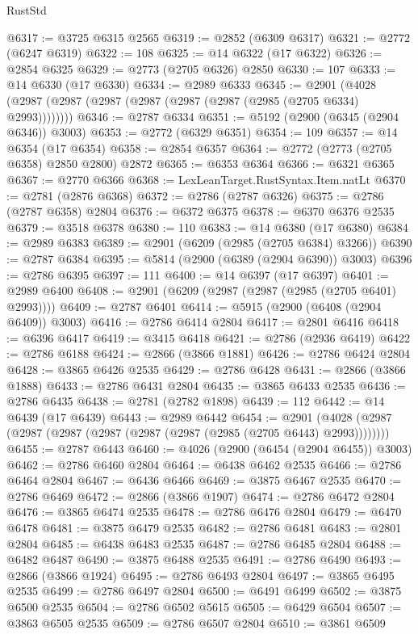 \begin{lexlean}{RustStd}
\begin{coremodule}
@6317 := @3725 @6315 @2565
@6319 := @2852 (@6309 @6317)
@6321 := @2772 (@6247 @6319)
@6322 := 108
@6325 := @14 @6322 (@17 @6322)
@6326 := @2854 @6325
@6329 := @2773 (@2705 @6326) @2850
@6330 := 107
@6333 := @14 @6330 (@17 @6330)
@6334 := @2989 @6333
@6345 := @2901 (@4028 (@2987 (@2987 (@2987 (@2987 (@2987 (@2987 (@2985 (@2705 @6334) @2993))))))))
@6346 := @2787 @6334
@6351 := @5192 (@2900 (@6345 (@2904 @6346)) @3003)
@6353 := @2772 (@6329 @6351)
@6354 := 109
@6357 := @14 @6354 (@17 @6354)
@6358 := @2854 @6357
@6364 := @2772 (@2773 (@2705 @6358) @2850 @2800) @2872
@6365 := @6353 @6364
@6366 := @6321 @6365
@6367 := @2770 @6366
@6368 := LexLeanTarget.RustSyntax.Item.natLt
@6370 := @2781 (@2876 @6368)
@6372 := @2786 (@2787 @6326)
@6375 := @2786 (@2787 @6358) @2804
@6376 := @6372 @6375
@6378 := @6370 @6376 @2535
@6379 := @3518 @6378
@6380 := 110
@6383 := @14 @6380 (@17 @6380)
@6384 := @2989 @6383
@6389 := @2901 (@6209 (@2985 (@2705 @6384) @3266))
@6390 := @2787 @6384
@6395 := @5814 (@2900 (@6389 (@2904 @6390)) @3003)
@6396 := @2786 @6395
@6397 := 111
@6400 := @14 @6397 (@17 @6397)
@6401 := @2989 @6400
@6408 := @2901 (@6209 (@2987 (@2987 (@2985 (@2705 @6401) @2993))))
@6409 := @2787 @6401
@6414 := @5915 (@2900 (@6408 (@2904 @6409)) @3003)
@6416 := @2786 @6414 @2804
@6417 := @2801 @6416
@6418 := @6396 @6417
@6419 := @3415 @6418
@6421 := @2786 (@2936 @6419)
@6422 := @2786 @6188
@6424 := @2866 (@3866 @1881)
@6426 := @2786 @6424 @2804
@6428 := @3865 @6426 @2535
@6429 := @2786 @6428
@6431 := @2866 (@3866 @1888)
@6433 := @2786 @6431 @2804
@6435 := @3865 @6433 @2535
@6436 := @2786 @6435
@6438 := @2781 (@2782 @1898)
@6439 := 112
@6442 := @14 @6439 (@17 @6439)
@6443 := @2989 @6442
@6454 := @2901 (@4028 (@2987 (@2987 (@2987 (@2987 (@2987 (@2987 (@2985 (@2705 @6443) @2993))))))))
@6455 := @2787 @6443
@6460 := @4026 (@2900 (@6454 (@2904 @6455)) @3003)
@6462 := @2786 @6460 @2804
@6464 := @6438 @6462 @2535
@6466 := @2786 @6464 @2804
@6467 := @6436 @6466
@6469 := @3875 @6467 @2535
@6470 := @2786 @6469
@6472 := @2866 (@3866 @1907)
@6474 := @2786 @6472 @2804
@6476 := @3865 @6474 @2535
@6478 := @2786 @6476 @2804
@6479 := @6470 @6478
@6481 := @3875 @6479 @2535
@6482 := @2786 @6481
@6483 := @2801 @2804
@6485 := @6438 @6483 @2535
@6487 := @2786 @6485 @2804
@6488 := @6482 @6487
@6490 := @3875 @6488 @2535
@6491 := @2786 @6490
@6493 := @2866 (@3866 @1924)
@6495 := @2786 @6493 @2804
@6497 := @3865 @6495 @2535
@6499 := @2786 @6497 @2804
@6500 := @6491 @6499
@6502 := @3875 @6500 @2535
@6504 := @2786 @6502 @5615
@6505 := @6429 @6504
@6507 := @3863 @6505 @2535
@6509 := @2786 @6507 @2804
@6510 := @3861 @6509

\end{coremodule}
\end{lexlean}
